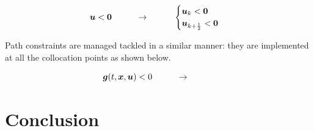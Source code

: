 \documentclass{thesisreport}
\begin{document}
\begin{equation}
\bm{u}<\bm{0} \text{\hspace{1cm}}\rightarrow  \text{\hspace{1cm}} \begin{cases}
\bm{u}_k <\bm{0} \\
\bm{u}_{k+\frac{1}{2}}<\bm{0}
\end{cases}
\end{equation}

Path constraints are managed tackled in a similar manner: they are implemented at all the collocation points as shown below.


\begin{equation}
\bm{g}(t,\bm{x},\bm{u}) < 0 \text{\hspace{1cm}} \rightarrow \text{\hspace{1cm}} 
\end{equation}



  
  
  
  
  
  
  
\newpage 
 
 \chapter*{Conclusion}
 
 
 
 


 \nocite{*}
 
 


 
\end{document}
